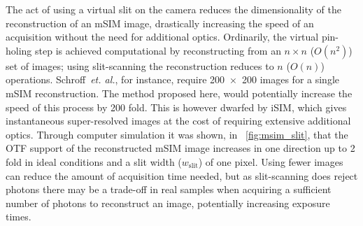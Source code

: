 The act of using a virtual slit on the camera reduces the dimensionality of the reconstruction of an \gls{mSIM} image, drastically increasing the speed of an acquisition without the need for additional optics.
Ordinarily, the virtual pin-holing step is achieved computational by reconstructing from an \(n\times n\) (\(O(n^2)\)) set of images; using \gls{slit-scanning} the reconstruction reduces to $n$ (\(O(n)\)) operations.
Schroff~\emph{et. al.}, for instance, require \SI{200 x 200}{} images for a single \gls{mSIM} reconstruction.
The method proposed here, would potentially increase the speed of this process by \SI{200}{} fold.
This is however dwarfed by \gls{iSIM}, which gives instantaneous super-resolved images at the cost of requiring extensive additional optics\cite{yorkInstantSuperresolutionImaging2013}.
Through computer simulation it was shown, in \figurename~\ref{fig:msim_slit}, that the \gls{OTF} support of the reconstructed \gls{mSIM} image increases in one direction up to \SI{2}{} fold in ideal conditions and a slit width (\(w_{\text{slit}}\)) of one pixel.
Using fewer images can reduce the amount of acquisition time needed, but as \gls{slit-scanning} does reject photons there may be a trade-off in real samples when acquiring a sufficient number of photons to reconstruct an image, potentially increasing exposure times.
